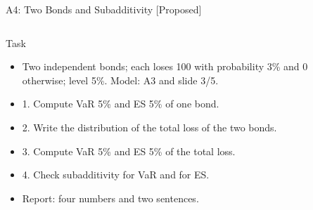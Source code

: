 \begin{frame}{A4: Two Bonds and Subadditivity [Proposed]}
\propsub
\itemsize{\scriptsize}
\begin{columns}[T]
\begin{column}{\taskw}
\begin{block}{Task}
\begin{itemize}
    \item Two independent bonds; each loses 100 with probability 3\% and 0 otherwise; level 5\%. Model: A3 and slide 3/5.
    \item 1. Compute VaR 5\% and ES 5\% of one bond.
    \item 2. Write the distribution of the total loss of the two bonds.
    \item 3. Compute VaR 5\% and ES 5\% of the total loss.
    \item 4. Check subadditivity for VaR and for ES.
    \item Report: four numbers and two sentences.
\end{itemize}
\end{block}
\end{column}
\begin{column}{\solw}
\end{column}
\end{columns}
\end{frame}


